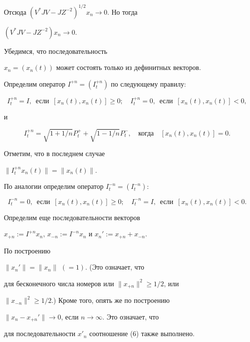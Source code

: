 Отсюда $(V^{*}JV-JZ^{-2})^{1/2}x_{n}\to 0$. Но тогда


$(V^{*}JV-JZ^{-2})x_{n}\to 0$.





Убедимся, что последовательность


$x_{n}=(x_{n}(t))$ может состоять только из дефинитных векторов.


Определим оператор $I^{+n}=(I^{+n}_{t})$ по следующему правилу:


$$


I^{+n}_{t}=I,\ \; \text{если}\ \; [x_{n}(t),x_{n}(t)]\geq 0;


\quad


I_{t}^{+n}=0,\ \; \text{если}\ \; [x_{n}(t),x_{n}(t)]<0,


$$


и


$$


I^{+n}_{t}=\sqrt{1+1/n}P^{+}_{t}+\sqrt{1-1/n}P^{-}_{t},\quad \text{когда}


\quad [x_{n}(t), x_{n}(t)]=0.


$$


Отметим, что в последнем случае


$\| I^{+n}_{t}x_{n}(t)\| =\| x_{n}(t)\|$.





По аналогии определим оператор $I^{-n}_{t}=(I_{t}^{-n})$:


$$


I_{t}^{-n}=0,\ \; \text{если}\ \; [x_{n}(t),x_{n}(t)]\geq 0;


\quad I_{t}^{-n}=I,\ \; \text{если}\ \; [x_{n}(t),x_{n}(t)]<0.


$$


Определим еще последовательности векторов


$x_{+n}:=I^{+n}x_{n}$, $x_{-n}:=I^{-n}x_{n}$ и $x_{n}':=x_{+n}+x_{-n}$.


По построению


$\| x_{n}'\| =\| x_{n}\|$ $(=1)$. (Это означает, что


для бесконечного числа номеров или $\| x_{+n}\|^{2}\geq 1/2$, или


$\| x_{-n}\|^{2}\geq 1/2$.) Кроме того, опять же по построению


$\| x_{n}-x_{+n}'\|\to 0$, если $n\to \infty$. Это означает, что


для последовательности $x'_{n}$ соотношение (6) также выполнено.


